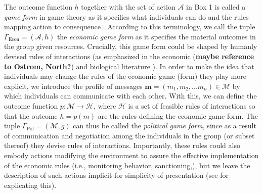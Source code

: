 \documentclass[12pt]{article}
\begin{document}
The outcome function $h$ together with the set of action $\mathcal{A}$ in Box 1 is called a \textit{game form} in game theory as it specifies what individuals can do and the rules mapping action to consequence \citep{RubinsteinO94}. According to this terminology, we call the tuple $\Gamma_\textrm{Econ}=(\mathcal{A},h)$ the \textit{economic game form} as it specifies the material outcomes in the group given resources. Crucially, this game form could be shaped by humanly devised rules of interactions (as emphasized in the economic ({\bf maybe reference to Ostrom, North?}) and biological literature \citep{PowersVSL16}). In order to make the idea that individuals may change the rules of the economic game (form) they play more explicit, we introduce the profile of messages $\mathbf{m}=(m_1,m_2,...m_n)\in\mathcal{M}$ by which individuals can communicate with each other. With this, we can define the outcome function $p:\mathcal{M} \to \mathcal{H}$, where $\mathcal{H}$ is a set of feasible rules of interactions so that the outcome $h=p(m)$ are the rules defining the economic game form. The tuple $\Gamma_\textrm{Pol}=(\mathcal{M},g)$ can thus be called the \textit{political game form}, since as a result of communication and negotiation among the individuals in the group (or subset thereof) they devise rules of interactions. Importantly, these rules could also embody actions modifying the environment to assure the effective implementation of the economic rules (i.e., monitoring behavior, sanctioning,\citep{ReiterH81,Hurwicz96}), but we leave the description of such actions implicit for simplicity of presentation (see \citep{ReiterH81,Hurwicz96} for explicating this).
\end{document}
